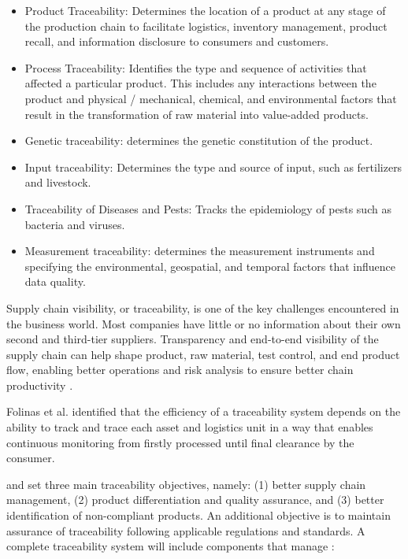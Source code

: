 \begin{itemize}
\item Product Traceability: Determines the location of a product at any stage of the production chain to facilitate logistics, inventory management, product recall, and information disclosure to consumers and customers.
\item Process Traceability: Identifies the type and sequence of activities that affected a particular product. This includes any interactions between the product and physical / mechanical, chemical, and environmental factors that result in the transformation of raw material into value-added products.
\item Genetic traceability: determines the genetic constitution of the product.
\item Input traceability: Determines the type and source of input, such as fertilizers and livestock.
\item Traceability of Diseases and Pests: Tracks the epidemiology of pests such as bacteria and viruses.
\item Measurement traceability: determines the measurement instruments and specifying the environmental, geospatial, and temporal factors that influence data quality.
\end{itemize}

Supply chain visibility, or traceability,  is one of the key challenges encountered in the business world. Most companies have little or no information about their own second and third-tier suppliers. Transparency and end-to-end visibility of the supply chain can help shape product, raw material, test control, and end product flow, enabling better operations and risk analysis to ensure better chain productivity \cite{abeyratne2016blockchain}.

Folinas et al. \cite{folinas2006traceability} identified that the efficiency of a traceability system depends on the ability to track and trace each asset and logistics unit in a way that enables continuous monitoring from firstly processed until final clearance by the consumer.

 and  set three main traceability objectives, namely: (1) better supply chain management, (2) product differentiation and quality assurance, and (3) better identification of non-compliant products. An additional objective is to maintain assurance of traceability following applicable regulations and standards. A complete traceability system will include components that manage \cite{vargas2017trazabilidad}:

